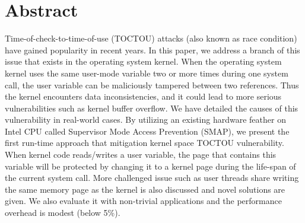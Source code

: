 \section{Abstract}

Time-of-check-to-time-of-use (TOCTOU) attacks (also known as race condition) have gained popularity in recent years. In this paper, we address a branch of this issue that exists in the operating system kernel. When the operating system kernel uses the same user-mode variable two or more times during one system call, the user variable can be maliciously tampered between two references. Thus the kernel encounters data inconsistencies, and it could lead to more serious vulnerabilities such as kernel buffer overflow. We have detailed the causes of this vulnerability in real-world cases. By utilizing an existing hardware feather on Intel CPU called Supervisor Mode Access Prevention (SMAP),  we present the first run-time approach that mitigation kernel space TOCTOU vulnerability. When kernel code reads/writes a user variable, the page that contains this variable will be protected by changing it to a kernel page during the life-span of the current system call. More challenged issue such as user threads share writing the same memory page as the kernel is also discussed and novel solutions are given. We also evaluate it with non-trivial applications and the performance overhead is modest (below 5\%).  


